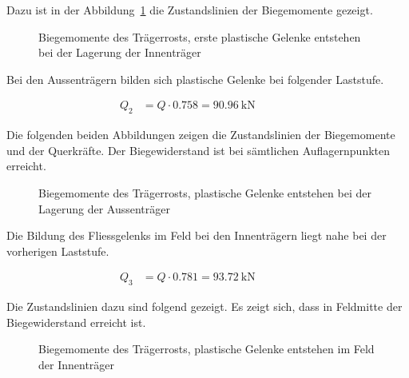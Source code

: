\documentclass[
  11pt,
  letterpaper,
]{scrreprt}
\makeatletter
\newcommand*\pandocbounded[1]{%
  \sbox\pandoc@box{#1}%
  \Gscale@div\@tempa{\textheight}{\dimexpr\ht\pandoc@box+\dp\pandoc@box\relax}%
  \Gscale@div\@tempb{\linewidth}{\wd\pandoc@box}%
  \ifdim\@tempb\p@<\@tempa\p@\let\@tempa\@tempb\fi%
  \ifdim\@tempa\p@<\p@\scalebox{\@tempa}{\usebox\pandoc@box}%
  \else\usebox{\pandoc@box}%
  \fi%
}
\makeatother
\begin{document}
Dazu ist in der Abbildung~\ref{fig-trm_1} die Zustandslinien der
Biegemomente gezeigt.

\begin{figure}[H]

\centering{

\pandocbounded{}

}

\caption{\label{fig-trm_1}Biegemomente des Trägerrosts, erste plastische
Gelenke entstehen bei der Lagerung der Innenträger}

\end{figure}%

Bei den Aussenträgern bilden sich plastische Gelenke bei folgender
Laststufe.

\[
\begin{aligned}
Q_{2}& = Q \cdot 0.758 = 90.96 \ \mathrm{kN} \quad &  \quad &  
 \end{aligned}
\]

Die folgenden beiden Abbildungen zeigen die Zustandslinien der
Biegemomente und der Querkräfte. Der Biegewiderstand ist bei sämtlichen
Auflagernpunkten erreicht.

\begin{figure}[H]

\centering{

\pandocbounded{}

}

\caption{\label{fig-trm_2}Biegemomente des Trägerrosts, plastische
Gelenke entstehen bei der Lagerung der Aussenträger}

\end{figure}%

Die Bildung des Fliessgelenks im Feld bei den Innenträgern liegt nahe
bei der vorherigen Laststufe.

\[
\begin{aligned}
Q_{3}& = Q \cdot 0.781 = 93.72 \ \mathrm{kN} \quad &  \quad &  
 \end{aligned}
\]

Die Zustandslinien dazu sind folgend gezeigt. Es zeigt sich, dass in
Feldmitte der Biegewiderstand erreicht ist.

\begin{figure}[H]

\centering{

\pandocbounded{}

}

\caption{\label{fig-trm_3}Biegemomente des Trägerrosts, plastische
Gelenke entstehen im Feld der Innenträger}

\end{figure}%
\end{document}
